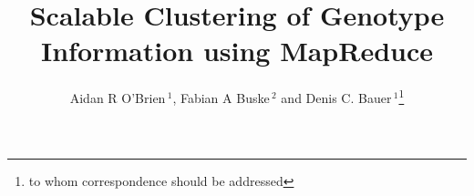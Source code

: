 \documentclass{bioinfo}
\begin{document}

	
\newcommand{\OnePhaseone}{phase1\_chr1}
\newcommand{\NinteenPhaseone}{phase1\_chr19}
\newcommand{\SevenPhaseone}{phase1\_chr1-7}
\newcommand{\FullPhaseone}{phase1\_chr1-22}
\newcommand{\OnePhasethree}{phase3\_chr1}
\newcommand{\ThreePhasethree}{phase3\_chr1-3}
\newcommand{\FullPhasethree}{phase3\_chr1-22}
\newcommand{\ARI}{Adjusted Rand Index}

\title[MapReduce Clustering]{Scalable Clustering of Genotype Information using MapReduce}
\author[O'Brien \textit{et~al}]{Aidan R O'Brien\,$^{1}$, Fabian A Buske\,$^{2}$ and Denis C. Bauer\,$^1$\footnote{to whom correspondence should be addressed}}
\address{$^{1}$CSIRO, Digital Productivity Flagship, 11 Julius Av, 2113, Sydney, Australia\\
$^{2}$Cancer Epigenetics Program, Cancer Research Division, Kinghorn Cancer Centre, Garvan Institute of Medical Research, 384 Victoria St, 2010, Sydney, Australia}



\maketitle
\end{document}
